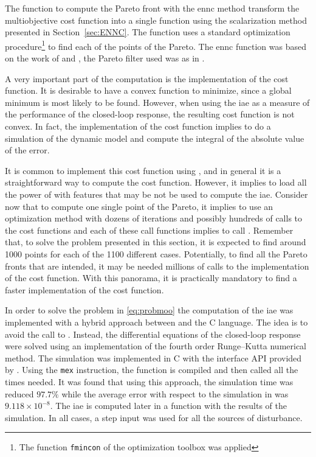 The function to compute the Pareto front with the \gls{ennc} method transform the multiobjective cost function into a single function using the scalarization method presented in Section~\ref{sec:ENNC}. The function uses a standard optimization procedure\footnote{The function \texttt{fmincon} of the \matlab optimization toolbox was applied} to find each of the points of the Pareto. The \gls{ennc} function was based on the work of \citet{Houska2011} and \citet{Logist2012}, the Pareto filter used was as in \citet{Cao2020}.

A very important part of the computation is the implementation of the cost function. It is desirable to have a convex function to minimize, since a global minimum is most likely to be found. However, when using the \gls{iae} as a measure of the performance of the closed-loop response, the resulting cost function is not convex. In fact, the implementation of the cost function implies to do a simulation of the dynamic model and compute the integral of the absolute value of the error.

It is common to implement this cost function using \simulink, and in general it is a straightforward way to compute the cost function. However, it implies to load all the power of \simulink{} with features that may be not be used to compute the \gls{iae}. Consider now that to compute one single point of the Pareto, it implies to use an optimization method with dozens of iterations and possibly hundreds of calls to the cost functions and each of these call functions implies to call \simulink{}. Remember that, to solve the problem presented in this section, it is expected to find around 1000 points for each of the 1100 different cases. Potentially, to find all the Pareto fronts that are intended, it may be needed millions of calls to the \simulink{} implementation of the cost function. With this panorama, it is practically mandatory to find a faster implementation of the cost function.

In order to solve the problem in \eqref{eq:probmoo} the computation of the \gls{iae} was implemented with a hybrid approach between \matlab{} and the C language. The idea is to avoid the call to \simulink. Instead, the differential equations of the closed-loop response were solved using an implementation of the fourth order Runge--Kutta numerical method. The simulation was implemented in C with the interface API provided by \matlab. Using the \texttt{mex} instruction, the function is compiled and then called all the times needed. It was found that using this approach, the simulation time was reduced $97.7\%$ while the average error with respect to the simulation in \simulink{} was $9.118\times10^{-8}$. The \gls{iae} is computed later in a \matlab{} function with the results of the simulation. In all cases, a step input was used for all the sources of disturbance.

